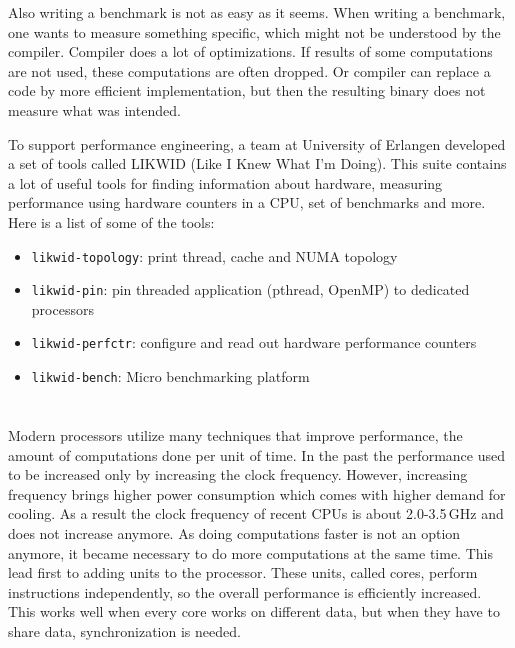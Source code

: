 Also writing a benchmark is not as easy as it seems. When writing a benchmark, one wants to measure something specific, which might not be understood by the compiler. Compiler does a lot of optimizations. If results of some computations are not used, these computations are often dropped. Or compiler can replace a code by more efficient implementation, but then the resulting binary does not measure what was intended.

To support performance engineering, a team at University of Erlangen developed a set of tools called LIKWID (Like I Knew What I’m Doing). This suite contains a lot of useful tools for finding information about hardware, measuring performance using hardware counters in a CPU, set of benchmarks and more.
Here is a list of some of the tools:

\begin{itemize}
    \item \texttt{likwid-topology}: print thread, cache and NUMA topology
    \item \texttt{likwid-pin}: pin threaded application (pthread, OpenMP) to dedicated processors
    \item \texttt{likwid-perfctr}: configure and read out hardware performance counters
    \item \texttt{likwid-bench}: Micro benchmarking platform
\end{itemize}

\section{}
\label{sec:arch}


Modern processors utilize many techniques that improve performance, the amount of computations done per unit of time. In the past the performance used to be increased only by increasing the clock frequency. However, increasing frequency brings higher power consumption which comes with higher demand for cooling. As a result the clock frequency of recent CPUs is about 2.0-3.5\,GHz and does not increase anymore.
As doing computations faster is not an option anymore, it became necessary to do more computations at the same time.
This lead first to adding units to the processor. These units, called cores, perform instructions independently, so the overall performance is efficiently increased. This works well when every core works on different data, but when they have to share data, synchronization is needed.

